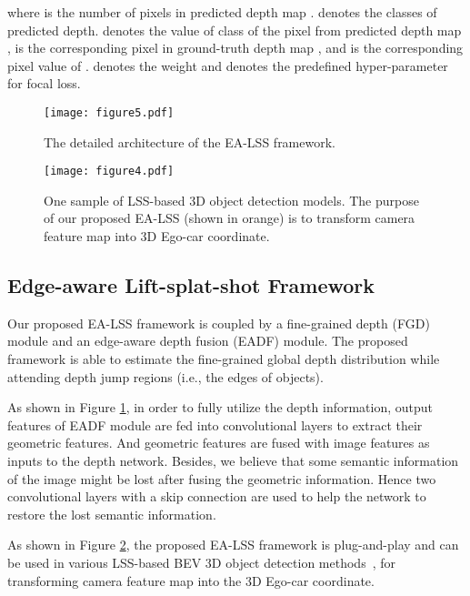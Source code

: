 \documentclass[letterpaper]{article} \usepackage[submission]{aaai24}  \usepackage{times}  \usepackage{helvet}  \usepackage{courier}  \usepackage[hyphens]{url}  \usepackage{graphicx} \urlstyle{rm} \def\UrlFont{\rm}  \usepackage{natbib}  \usepackage{caption} \frenchspacing  \setlength{\pdfpagewidth}{8.5in} \setlength{\pdfpageheight}{11in} \usepackage{algorithm}
\begin{document}
where  is the number of pixels in predicted depth map .  denotes the classes of predicted depth.   denotes the value of  class of the  pixel from predicted depth map ,  is  the corresponding pixel in ground-truth depth map ,  and  is the corresponding pixel value of .  denotes the weight and   denotes the predefined hyper-parameter for focal loss.

\begin{figure}[t]
\begin{center}
\texttt{[image: figure5.pdf]}
\end{center}
   \caption{The detailed architecture of the EA-LSS framework.} \label{fig:depth_sem_arch}
\end{figure}



\begin{figure}[t]
\begin{center}
\texttt{[image: figure4.pdf]}
\end{center}
   \caption{One sample of LSS-based 3D object detection models. The purpose of our proposed EA-LSS (shown in orange) is to transform camera feature map into 3D Ego-car coordinate. } \label{fig:bev_arch}
\end{figure}
\subsection{Edge-aware Lift-splat-shot Framework}
Our proposed EA-LSS framework is coupled by a fine-grained depth (FGD) module and an edge-aware depth fusion (EADF) module. The proposed framework is able to estimate the fine-grained global depth distribution while attending depth jump regions (i.e., the edges of objects). 

As shown in Figure \ref{fig:depth_sem_arch}, in order to fully utilize the depth information, output features of EADF module  are fed into convolutional layers to extract their geometric features. And geometric features are fused with image features as inputs to the depth network. 
Besides, we believe that some semantic information of the image might be lost after fusing the geometric information. Hence two convolutional layers with a skip connection are used to help the network to restore the lost semantic information.

As shown in Figure \ref{fig:bev_arch}, the proposed EA-LSS framework is plug-and-play and can be used in various LSS-based BEV 3D object detection methods~\cite{huang2021bevdet,liang2022bevfusion, CaDDN, li2022bevdepth}, for transforming camera feature map into the 3D Ego-car coordinate. 
\end{document}
